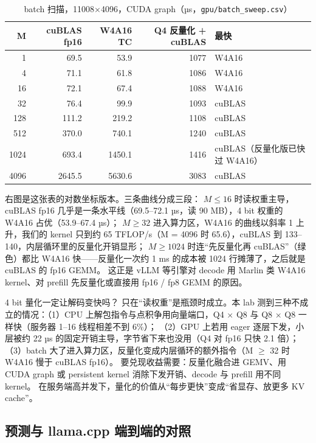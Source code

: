 \documentclass[11pt,a4paper]{ctexart}
\begin{document}
\begin{table}[H]
\centering\small
\caption{batch 扫描，11008×4096，CUDA graph（µs，\texttt{gpu/batch\_sweep.csv}）}\label{tab:batch}
\begin{tabular}{rrrrl}
\toprule
M & cuBLAS fp16 & W4A16 TC & Q4 反量化 + cuBLAS & 最快 \\
\midrule
1 & 69.5 & 53.9 & 1077 & W4A16 \\
4 & 71.1 & 61.8 & 1086 & W4A16 \\
16 & 72.1 & 67.4 & 1088 & W4A16 \\
32 & 76.4 & 99.9 & 1093 & cuBLAS \\
128 & 111.2 & 219.2 & 1108 & cuBLAS \\
512 & 370.0 & 740.1 & 1240 & cuBLAS \\
1024 & 693.4 & 1450.1 & 1416 & cuBLAS（反量化版已快过 W4A16） \\
4096 & 2645.5 & 5630.6 & 3083 & cuBLAS \\
\bottomrule
\end{tabular}
\end{table}

 右图是这张表的对数坐标版本。三条曲线分成三段：
$M \le 16$ 时读权重主导，cuBLAS fp16 几乎是一条水平线（69.5--72.1 µs，读 90 MB），4 bit 权重的 W4A16 占优（53.9--67.4 µs）；
$M \ge 32$ 进入算力区，W4A16 的曲线以斜率 1 上升，我们的 kernel 只到约 65 TFLOP/s（M = 4096 时 65.6），cuBLAS 到 133--140，内层循环里的反量化开销显形；
$M \ge 1024$ 时连“先反量化再 cuBLAS”（绿色）都比 W4A16 快——反量化一次约 1 ms 的成本被 1024 行摊薄了，之后就是 cuBLAS 的 fp16 GEMM。
这正是 vLLM 等引擎对 decode 用 Marlin 类 W4A16 kernel、对 prefill 先反量化或直接用 fp16 / fp8 GEMM 的原因。

\begin{iqbox}{4 bit 量化一定让解码变快吗？}
只在“读权重”是瓶颈时成立。本 lab 测到三种不成立的情况：（1）CPU 上解包指令与点积争用向量端口，Q4 × Q8 与 Q8 × Q8 一样快（服务器 1--16 线程相差不到 6\%）；
（2）GPU 上若用 eager 逐层下发，小层被约 22 µs 的固定开销主导，字节省下来也没用（Q4 对 fp16 只快 2.1 倍）；
（3）batch 大了进入算力区，反量化变成内层循环的额外指令（M $\ge$ 32 时 W4A16 慢于 cuBLAS fp16）。
要兑现收益需要：反量化融合进 GEMV、用 CUDA graph 或 persistent kernel 消除下发开销、decode 与 prefill 用不同 kernel。
在服务端高并发下，量化的价值从“每步更快”变成“省显存、放更多 KV cache”。
\end{iqbox}

\subsection{预测与 llama.cpp 端到端的对照}\label{sec:pred-check}
\end{document}
